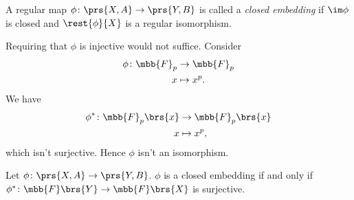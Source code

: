 \documentclass[10pt,a4paper,twoside,openany,hidelinks]{book}
\begin{document}
\begin{definition}
A regular map $\phi \colon \prs{X,A} \to \prs{Y,B}$ is called a \emph{closed embedding} if $\im\phi$ is closed and $\rest{\phi}{X}$ is a regular isomorphism.
\end{definition}

\begin{remark}
Requiring that $\phi$ is injective would not suffice. Consider
\begin{align*}
\phi \colon \mbb{F}_p &\to \mbb{F}_p \\
x &\mapsto x^p \text{.}
\end{align*}
We have
\begin{align*}
\phi^* \colon \mbb{F}_p\brs{x} &\to \mbb{F}_p\brs{x} \\
x &\mapsto x^p \text{,}
\end{align*}
which isn't surjective. Hence $\phi$ isn't an isomorphism.
\end{remark}

\begin{proposition}
Let $\phi \colon \prs{X,A} \to \prs{Y,B}$. $\phi$ is a closed embedding if and only if $\phi^* \colon \mbb{F}\brs{Y} \to \mbb{F}\brs{X}$ is surjective.
\end{proposition}
\end{document}
